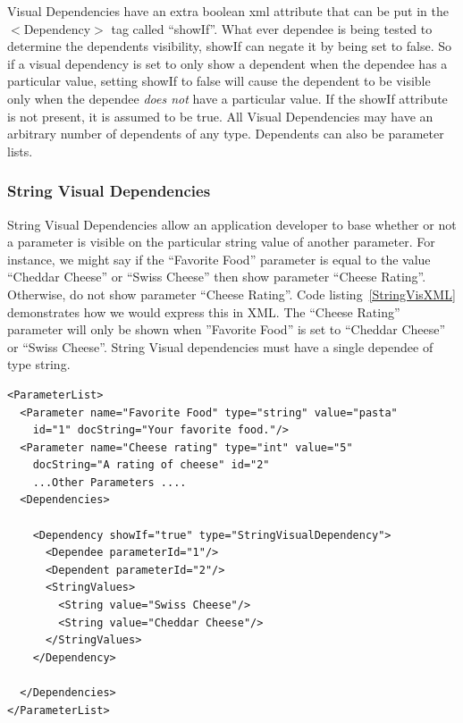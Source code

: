 Visual Dependencies have an extra boolean xml attribute that can be put in the $<$Dependency$>$ tag called ``showIf''. What ever dependee is being tested to 
determine the dependents visibility, showIf can negate it by being set to false. So if a visual dependency is set to only show a dependent when the
dependee has a particular value, setting showIf to false will cause the dependent to be visible only when the dependee \emph{does not} have a particular
value. If the showIf attribute is not present, it is assumed to be true. All Visual Dependencies may have an arbitrary number of dependents of any type.
Dependents can also be parameter lists.

\subsubsection{String Visual Dependencies}
String Visual Dependencies allow an application developer to base whether or not a parameter is visible on the particular string value of another
parameter. For instance, we might say if the ``Favorite Food'' parameter  is equal to the value ``Cheddar Cheese'' or ``Swiss Cheese'' then show parameter ``Cheese Rating''. 
Otherwise, do not show parameter ``Cheese Rating''. Code listing~\ref{StringVisXML} demonstrates how we would express this in XML. The 
``Cheese Rating'' parameter will only be shown when ''Favorite Food'' is set to ``Cheddar Cheese'' or ``Swiss Cheese''. String Visual dependencies must have a single 
dependee of type string. 
\begin{lstlisting}[caption={Example usage of a String Visual Dependency}, label=StringVisXML]
<ParameterList>
  <Parameter name="Favorite Food" type="string" value="pasta"
    id="1" docString="Your favorite food."/>
  <Parameter name="Cheese rating" type="int" value="5"
    docString="A rating of cheese" id="2"
    ...Other Parameters ....
  <Dependencies>

    <Dependency showIf="true" type="StringVisualDependency">
      <Dependee parameterId="1"/>
      <Dependent parameterId="2"/>
      <StringValues>
        <String value="Swiss Cheese"/>
        <String value="Cheddar Cheese"/>
      </StringValues>
    </Dependency>

  </Dependencies>
</ParameterList>
\end{lstlisting}


